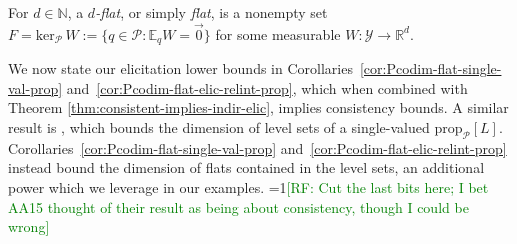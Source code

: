 \documentclass[anon,12pt]{colt2021} %
\newcommand{\Comments}{1}
\newcommand{\mynote}[2]{\ifnum\Comments=1\textcolor{#1}{#2}\fi}
\newcommand{\raf}[1]{\mynote{green}{[RF: #1]}}
\newcommand{\jessie}[1]{\mynote{purple}{[JF: #1]}}
\newcommand{\reals}{\mathbb{R}}
\newcommand{\prop}[2][\mathcal{P}]{\mathrm{prop}_{#1}[#2]}
\newcommand{\zeros}[1]{\mathrm{ker}_\P\,#1}
\newcommand{\E}{\mathbb{E}}
\renewcommand{\P}{\mathcal{P}}
\newcommand{\Y}{\mathcal{Y}}
\begin{document}
\begin{definition}[Flat]\label{def:flat-general}
  For $d\in\mathbb N$, a \emph{$d$-flat}, or simply \emph{flat}, is a nonempty set $F = \zeros{W} := \{q \in \P : \E_q W = \vec 0\}$ for some measurable $W:\Y \to \reals^d$.
\end{definition}

We now state our elicitation lower bounds in Corollaries~\ref{cor:Pcodim-flat-single-val-prop} and~\ref{cor:Pcodim-flat-elic-relint-prop}, which when combined with Theorem \ref{thm:consistent-implies-indir-elic}, implies consistency bounds.
A similar result is \citet[Theorem 9]{agarwal2015consistent}, which bounds the dimension of level sets of a single-valued $\prop{L}$.
Corollaries~\ref{cor:Pcodim-flat-single-val-prop} and~\ref{cor:Pcodim-flat-elic-relint-prop} instead bound the dimension of flats contained in the level sets, an additional power which we leverage in our examples.
\raf{Cut the last bits here; I bet AA15 thought of their result as being about consistency, though I could be wrong}
\end{document}

